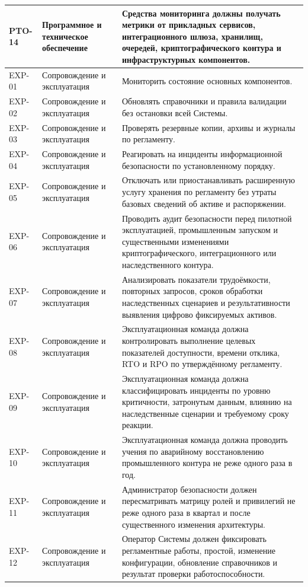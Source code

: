 \begin{longtable}{|P{1.45cm}|P{3.35cm}|P{10.7cm}|}
PTO-14 & Программное и техническое обеспечение & Средства мониторинга должны получать метрики от прикладных сервисов, интеграционного шлюза, хранилищ, очередей, криптографического контура и инфраструктурных компонентов.\\ \hline
EXP-01 & Сопровождение и эксплуатация & Мониторить состояние основных компонентов.\\ \hline
EXP-02 & Сопровождение и эксплуатация & Обновлять справочники и правила валидации без остановки всей Системы.\\ \hline
EXP-03 & Сопровождение и эксплуатация & Проверять резервные копии, архивы и журналы по регламенту.\\ \hline
EXP-04 & Сопровождение и эксплуатация & Реагировать на инциденты информационной безопасности по установленному порядку.\\ \hline
EXP-05 & Сопровождение и эксплуатация & Отключать или приостанавливать расширенную услугу хранения по регламенту без утраты базовых сведений об активе и распоряжении.\\ \hline
EXP-06 & Сопровождение и эксплуатация & Проводить аудит безопасности перед пилотной эксплуатацией, промышленным запуском и существенными изменениями криптографического, интеграционного или наследственного контура.\\ \hline
EXP-07 & Сопровождение и эксплуатация & Анализировать показатели трудоёмкости, повторных запросов, сроков обработки наследственных сценариев и результативности выявления цифрово фиксируемых активов.\\ \hline
EXP-08 & Сопровождение и эксплуатация & Эксплуатационная команда должна контролировать выполнение целевых показателей доступности, времени отклика, RTO и RPO по утверждённому регламенту.\\ \hline
EXP-09 & Сопровождение и эксплуатация & Эксплуатационная команда должна классифицировать инциденты по уровню критичности, затронутым данным, влиянию на наследственные сценарии и требуемому сроку реакции.\\ \hline
EXP-10 & Сопровождение и эксплуатация & Эксплуатационная команда должна проводить учения по аварийному восстановлению промышленного контура не реже одного раза в год.\\ \hline
EXP-11 & Сопровождение и эксплуатация & Администратор безопасности должен пересматривать матрицу ролей и привилегий не реже одного раза в квартал и после существенного изменения архитектуры.\\ \hline
EXP-12 & Сопровождение и эксплуатация & Оператор Системы должен фиксировать регламентные работы, простой, изменение конфигурации, обновление справочников и результат проверки работоспособности.\\ \hline

\end{longtable}
